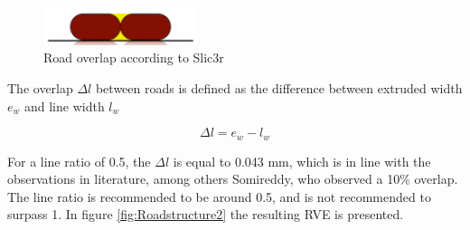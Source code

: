 \begin{figure}[H]
    \centering
    \includegraphics[width=0.40\textwidth]{chapter_4_RVE_Definition/figures/Roadoverlapslic3r.PNG}
    \caption{Road overlap according to Slic3r \cite{GaryHodgsonSlic3rMath}}
    \label{fig:Roadoverlapslic3r}
\end{figure}
The overlap $\Delta l$ between roads is defined as the difference between extruded width $e_w$ and line width $l_w$

\begin{equation} \label{eqn:overlap}
\Delta l=e_w-l_w
\end{equation}




For a line ratio of 0.5, the $\Delta l$ is equal to 0.043 mm, which is in line with the observations in literature, among others Somireddy, who observed a 10\% overlap. The line ratio is recommended to be around 0.5, and is not recommended to surpass 1.  In figure \ref{fig:Roadstructure2} the resulting RVE is presented.

